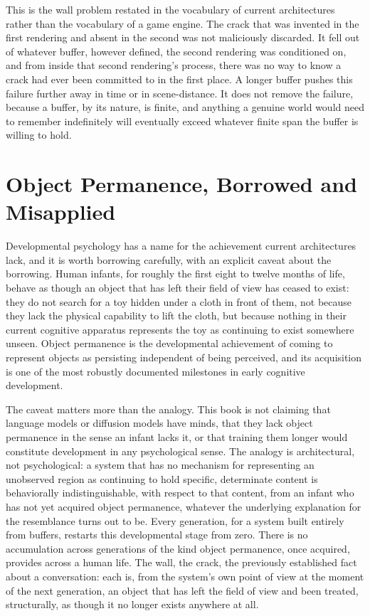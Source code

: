 This is the wall problem restated in the vocabulary of current architectures rather than the vocabulary of a game engine. The crack that was invented in the first rendering and absent in the second was not maliciously discarded. It fell out of whatever buffer, however defined, the second rendering was conditioned on, and from inside that second rendering's process, there was no way to know a crack had ever been committed to in the first place. A longer buffer pushes this failure further away in time or in scene-distance. It does not remove the failure, because a buffer, by its nature, is finite, and anything a genuine world would need to remember indefinitely will eventually exceed whatever finite span the buffer is willing to hold.

\section{Object Permanence, Borrowed and Misapplied}

Developmental psychology has a name for the achievement current architectures lack, and it is worth borrowing carefully, with an explicit caveat about the borrowing. Human infants, for roughly the first eight to twelve months of life, behave as though an object that has left their field of view has ceased to exist: they do not search for a toy hidden under a cloth in front of them, not because they lack the physical capability to lift the cloth, but because nothing in their current cognitive apparatus represents the toy as continuing to exist somewhere unseen. Object permanence is the developmental achievement of coming to represent objects as persisting independent of being perceived, and its acquisition is one of the most robustly documented milestones in early cognitive development.

The caveat matters more than the analogy. This book is not claiming that language models or diffusion models have minds, that they lack object permanence in the sense an infant lacks it, or that training them longer would constitute development in any psychological sense. The analogy is architectural, not psychological: a system that has no mechanism for representing an unobserved region as continuing to hold specific, determinate content is behaviorally indistinguishable, with respect to that content, from an infant who has not yet acquired object permanence, whatever the underlying explanation for the resemblance turns out to be. Every generation, for a system built entirely from buffers, restarts this developmental stage from zero. There is no accumulation across generations of the kind object permanence, once acquired, provides across a human life. The wall, the crack, the previously established fact about a conversation: each is, from the system's own point of view at the moment of the next generation, an object that has left the field of view and been treated, structurally, as though it no longer exists anywhere at all.

